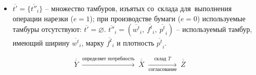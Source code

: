 \begin{itemize}
Ограничения по~складу (ограничения~8 и~9) применяются к~обеим переменным, что~позволяет предотвращать переполнение не~только в~текущий момент, но~и~с~учётом уже запущенных в~производство тамбуров.
Для двухэтапной нарезки это правило распространяется и на промежуточные рулоны с нулевым номером заказа: перед запуском производящей их операции резервируется место под выход после изъятия входных тамбуров. При завершении производства или резки ожидаемый полуфабрикат становится фактическим содержимым склада, оставаясь в общем зарезервированном содержимом; ёмкость освобождается только при изъятии полуфабриката на следующую обработку. Конечные заказные рулоны в этих складах полуфабриката не учитываются.
    
    \item $\overline{t'} = \{{\overline{t''}}_{i}\}$ -- множество тамбуров, изъятых со~склада для~выполнения операции нарезки ($e=1$); при производстве бумаги ($e=0$) используемые тамбуры отсутствуют: $\overline{t'} = \varnothing$.
${\overline{t''}}_{i} = ({\overline{w^t}}_{i},\ {\overline{f^t}}_{i},\ {\overline{p^t}}_{i})$ -- используемый тамбур, имеющий ширину ${\overline{w^t}}_{i}$, марку ${\overline{f^t}}_{i}$ и плотность ${\overline{p^t}}_{i}$.
\end{itemize}

\[
\overline{\overline{Y}} \;\xrightarrow{\text{определяет потребность}}\; \overline{\overline{X}} \;\xrightarrow[\text{согласование}]{\text{склад }\overline{T}}\; \overline{\overline{Z}}
\]

